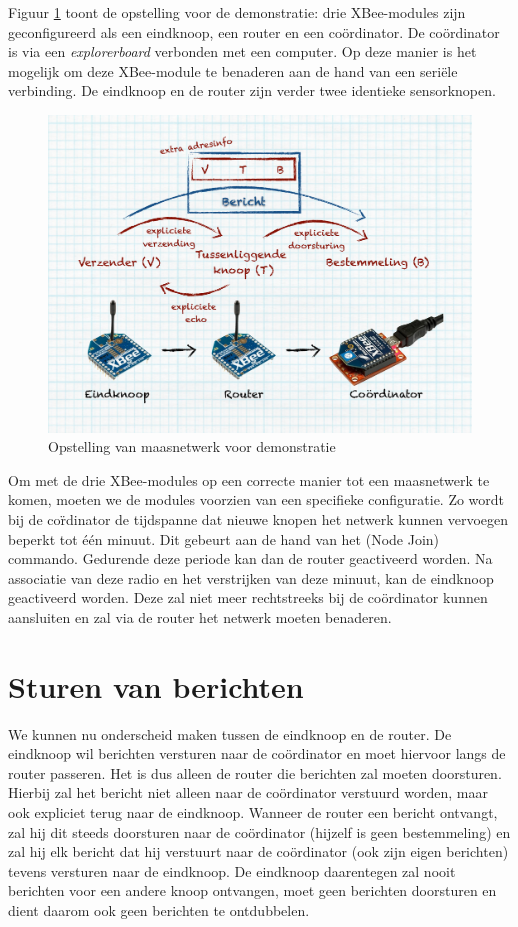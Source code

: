 Figuur \ref{fig:xbee-setup} toont de opstelling voor de demonstratie: drie
XBee-modules zijn geconfigureerd als een eindknoop, een router en een
co\"ordinator. De co\"ordinator is via een \emph{explorerboard} verbonden met
een computer. Op deze manier is het mogelijk om deze XBee-module te benaderen
aan de hand van een seri\"ele verbinding. De eindknoop en de router zijn verder
twee identieke sensorknopen.

\begin{figure}[ht]
  \centering
  \includegraphics[width=0.9\linewidth]{resources/xbee-setup.pdf}
  \caption{Opstelling van maasnetwerk voor demonstratie}
  \label{fig:xbee-setup}
\end{figure}

Om met de drie XBee-modules op een correcte manier tot een maasnetwerk te
komen, moeten we de modules voorzien van een specifieke configuratie. Zo wordt
bij de co\"rdinator de tijdspanne dat nieuwe knopen het netwerk kunnen
vervoegen beperkt tot \'e\'en minuut. Dit gebeurt aan de hand van het 
(Node Join) commando. Gedurende deze periode kan dan de router geactiveerd
worden. Na associatie van deze radio en het verstrijken van deze minuut, kan de
eindknoop geactiveerd worden. Deze zal niet meer rechtstreeks bij de
co\"ordinator kunnen aansluiten en zal via de router het netwerk moeten
benaderen.

\section{Sturen van berichten}

We kunnen nu onderscheid maken tussen de eindknoop en de router. De eindknoop
wil berichten versturen naar de co\"ordinator en moet hiervoor langs de router
passeren. Het is dus alleen de router die berichten zal moeten doorsturen.
Hierbij zal het bericht niet alleen naar de co\"ordinator verstuurd worden,
maar ook expliciet terug naar de eindknoop. Wanneer de router een bericht
ontvangt, zal hij dit steeds doorsturen naar de co\"ordinator (hijzelf is geen
bestemmeling) en zal hij elk bericht dat hij verstuurt naar de co\"ordinator
(ook zijn eigen berichten) tevens versturen naar de eindknoop. De eindknoop
daarentegen zal nooit berichten voor een andere knoop ontvangen, moet geen
berichten doorsturen en dient daarom ook geen berichten te ontdubbelen.

